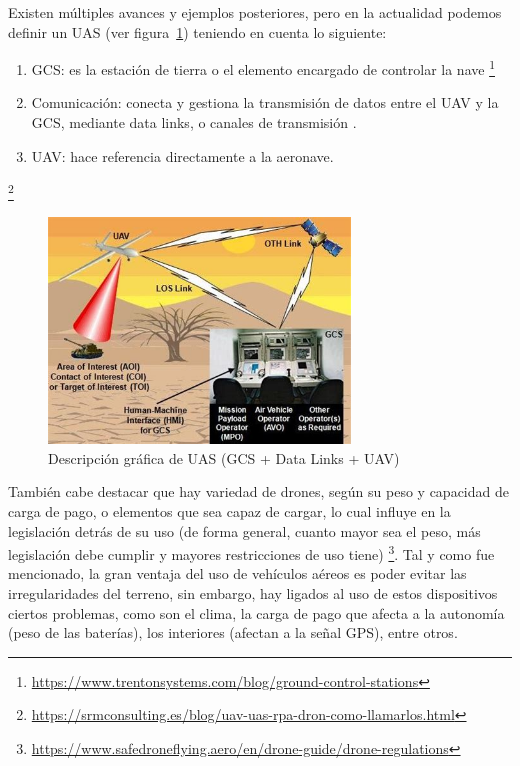 Existen múltiples avances y ejemplos posteriores, pero en la actualidad podemos definir un \ac{UAS} (ver figura~\ref{fig:drone_components}) teniendo en cuenta lo siguiente:

\begin{enumerate}
	\item \ac{GCS}: es la estación de tierra o el elemento encargado de controlar la nave \footnote[10]{\url{https://www.trentonsystems.com/blog/ground-control-stations}}
	\item Comunicación: conecta y gestiona la transmisión de datos entre el \ac{UAV} y la \ac{GCS}, mediante data links, o canales de transmisión \cite{data-link-definicion}.
    \item \ac{UAV}: hace referencia directamente a la aeronave.
\end{enumerate} \footnote[11]{\url{https://srmconsulting.es/blog/uav-uas-rpa-dron-como-llamarlos.html}}

\begin{figure} [tp]
	\begin{center}
	\includegraphics[height=6cm]{imagenes/cap1/7_drone_components.jpeg}
	\end{center}
	\caption[Descripción gráfica de \ac{UAS} (GCS + Data Links + UAV)]{Descripción gráfica de \ac{UAS} (GCS + Data Links + UAV)}
	\label{fig:drone_components}
\end{figure}

También cabe destacar que hay variedad de drones, según su peso y capacidad de carga de pago, o elementos que sea capaz de cargar, lo cual influye en la legislación detrás de su uso (de forma general, cuanto mayor sea el peso, más legislación debe cumplir y mayores restricciones de uso tiene) \footnote[12]{\url{https://www.safedroneflying.aero/en/drone-guide/drone-regulations}}. Tal y como fue mencionado, la gran ventaja del uso de vehículos aéreos es poder evitar las irregularidades del terreno, sin embargo, hay ligados al uso de estos dispositivos ciertos problemas, como son el clima, la carga de pago que afecta a la autonomía (peso de las baterías), los interiores (afectan a la señal GPS), entre otros.\\

